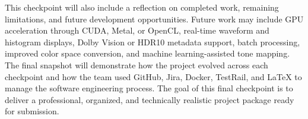 \documentclass[12pt]{article}
\begin{document}
This checkpoint will also include a reflection on completed work, remaining limitations, and future development opportunities. Future work may include GPU acceleration through CUDA, Metal, or OpenCL, real-time waveform and histogram displays, Dolby Vision or HDR10 metadata support, batch processing, improved color space conversion, and machine learning-assisted tone mapping. The final snapshot will demonstrate how the project evolved across each checkpoint and how the team used GitHub, Jira, Docker, TestRail, and LaTeX to manage the software engineering process. The goal of this final checkpoint is to deliver a professional, organized, and technically realistic project package ready for submission.

\end{document}
